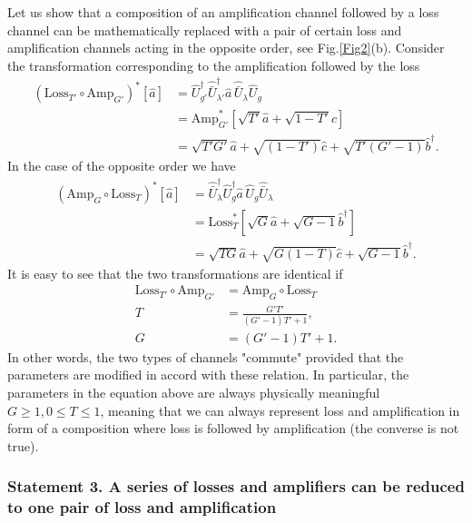 \documentclass[a4paper]{article}
\renewcommand{\t}[1]{\mathrm{#1}}
\newcommand{\be}{\begin{equation}}
\newcommand{\ee}{\end{equation}}
\begin{document}
Let us show that a composition of an amplification channel followed by a loss channel can be mathematically replaced with a pair of certain loss and amplification channels acting in the opposite order, see Fig.\ref{Fig2}(b).
Consider the transformation corresponding to the amplification followed by the loss
\be\label{eq: AT}\begin{split}
    (\t{Loss}_{T'}\circ \t{Amp}_{G'})^*[\hat{a}] &=   \hat{U}_{g'}^\dag \hat{\bar U}_{\lambda'}^\dag \hat{a} \, \hat{\bar U}_\lambda \hat{U}_g \\
    & = \t{Amp}_{G'}^* [\sqrt{T'} \hat{a} + \sqrt{1-T'} \hat{c}]\\
    & =\sqrt{T' G'} \hat{a} +\sqrt{(1-T')} \hat{c} + \sqrt{T'(G'-1)} \hat{b}^\dag.
\end{split}
\ee
In the case of the opposite order we have
\be\label{eq: TA}\begin{split}
    (\t{Amp}_G\circ\t{Loss}_T)^*[\hat{a}] &= \hat{\bar U}_\lambda^\dag \hat{U}_g^\dag \hat{a} \, \hat{U}_g \hat{\bar U}_\lambda\\
    & = \t{Loss}_T^* [\sqrt{G} \hat{a} + \sqrt{G-1} \hat{b}^\dag]\\
    & =\sqrt{T G} \hat{a} +\sqrt{G(1-T)} \hat{c} + \sqrt{G-1} \hat{b}^\dag.
\end{split}
\ee
It is easy to see that the two transformations are identical if 
\be\label{permute}\boxed{\begin{aligned}
    \t{Loss}_{T'}\circ \t{Amp}_{G'} &= \t{Amp}_G\circ\t{Loss}_T\\
    T &= \frac{G' T'}{(G'-1)T'+ 1},\\
    G &= (G'-1)T '+1.
\end{aligned}}
\ee
In other words, the two types of channels "commute" provided that the parameters are modified in accord with these relation.
In particular, the parameters in the equation above are always physically meaningful $G\geq 1, 0\leq T \leq 1$, meaning that we can always represent loss and amplification in form of a composition where loss is followed by amplification (the converse is not true).\\


\subsubsection*{Statement 3. A series of losses and amplifiers can be reduced to one pair of loss and amplification}
\end{document}
